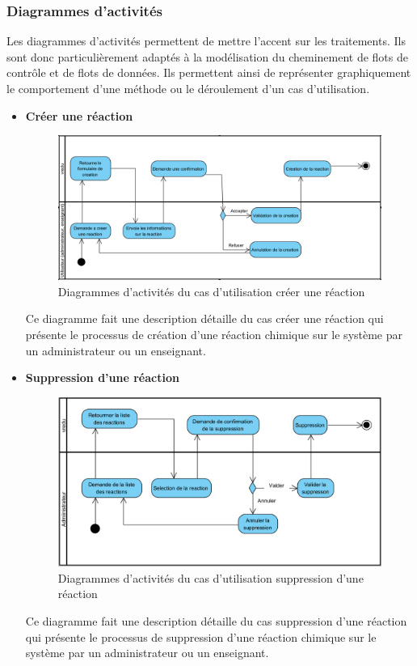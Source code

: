 \subsubsection{Diagrammes d’activités}

Les diagrammes d'activités permettent de mettre l'accent sur les traitements. Ils sont donc particulièrement adaptés à la modélisation du cheminement de flots de contrôle et de flots de données. Ils permettent ainsi de représenter graphiquement le comportement d'une méthode ou le déroulement d'un cas d'utilisation. 

\begin{itemize}
	\item \textbf{Créer une réaction }

	\begin{figure}[H]
		\centering
		\includegraphics[width=1\textwidth]{img/sdCUR}
		\caption{Diagrammes d’activités du cas d'utilisation créer une réaction}
		\label{fig:mesh1}
	\end{figure}

	Ce diagramme fait une description détaille du cas créer une réaction qui présente le processus de création d’une réaction chimique sur le système par un administrateur ou un enseignant. 

	\item \textbf{Suppression d’une réaction}

	\begin{figure}[H]
		\centering
		\includegraphics[width=1\textwidth]{img/adsr}
		\caption{Diagrammes d’activités du cas d'utilisation suppression d’une réaction}
		\label{fig:mesh1}
	\end{figure}

	Ce diagramme fait une description détaille du cas suppression d’une réaction qui présente le processus de suppression d’une réaction chimique sur le système par un administrateur ou un enseignant. 
\end{itemize}

